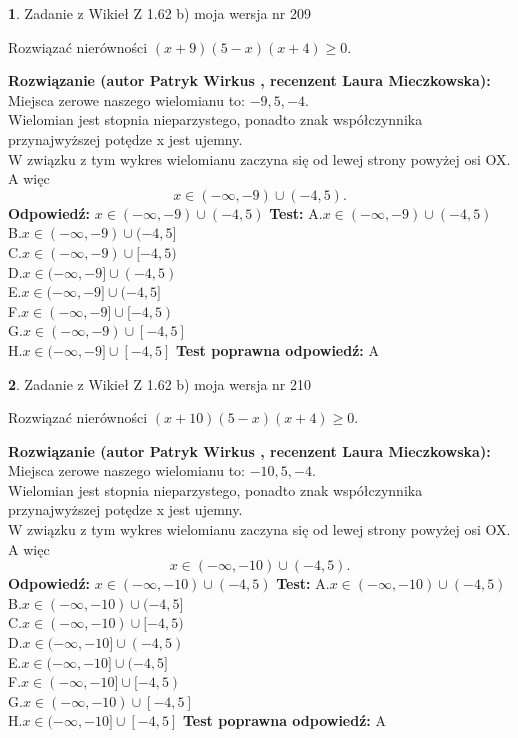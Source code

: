 \documentclass[12pt, a4paper]{article}
\theoremstyle{definition} %
\newtheorem{zad}{}
\newcommand{\zadStart}[1]{\begin{zad}#1\newline}
\newcommand{\zadStop}{\end{zad}}
\newcommand{\rozwStart}[2]{\noindent \textbf{Rozwiązanie (autor #1 , recenzent #2): }\newline}
\newcommand{\rozwStop}{\newline}
\newcommand{\odpStart}{\noindent \textbf{Odpowiedź:}\newline}
\newcommand{\odpStop}{\newline}
\newcommand{\testStart}{\noindent \textbf{Test:}\newline}
\newcommand{\testStop}{\newline}
\newcommand{\kluczStart}{\noindent \textbf{Test poprawna odpowiedź:}\newline}
\newcommand{\kluczStop}{\newline}
\begin{document}
\zadStart{Zadanie z Wikieł Z 1.62 b) moja wersja nr 209}

Rozwiązać nierówności $(x+9)(5-x)(x+4)\ge0$.
\zadStop
\rozwStart{Patryk Wirkus}{Laura Mieczkowska}
Miejsca zerowe naszego wielomianu to: $-9, 5, -4$.\\
Wielomian jest stopnia nieparzystego, ponadto znak współczynnika przy\linebreak najwyższej potędze x jest ujemny.\\ W związku z tym wykres wielomianu zaczyna się od lewej strony powyżej osi OX. A więc $$x \in (-\infty,-9) \cup (-4,5).$$
\rozwStop
\odpStart
$x \in (-\infty,-9) \cup (-4,5)$
\odpStop
\testStart
A.$x \in (-\infty,-9) \cup (-4,5)$\\
B.$x \in (-\infty,-9) \cup (-4,5]$\\
C.$x \in (-\infty,-9) \cup [-4,5)$\\
D.$x \in (-\infty,-9] \cup (-4,5)$\\
E.$x \in (-\infty,-9] \cup (-4,5]$\\
F.$x \in (-\infty,-9] \cup [-4,5)$\\
G.$x \in (-\infty,-9) \cup [-4,5]$\\
H.$x \in (-\infty,-9] \cup [-4,5]$
\testStop
\kluczStart
A
\kluczStop



\zadStart{Zadanie z Wikieł Z 1.62 b) moja wersja nr 210}

Rozwiązać nierówności $(x+10)(5-x)(x+4)\ge0$.
\zadStop
\rozwStart{Patryk Wirkus}{Laura Mieczkowska}
Miejsca zerowe naszego wielomianu to: $-10, 5, -4$.\\
Wielomian jest stopnia nieparzystego, ponadto znak współczynnika przy\linebreak najwyższej potędze x jest ujemny.\\ W związku z tym wykres wielomianu zaczyna się od lewej strony powyżej osi OX. A więc $$x \in (-\infty,-10) \cup (-4,5).$$
\rozwStop
\odpStart
$x \in (-\infty,-10) \cup (-4,5)$
\odpStop
\testStart
A.$x \in (-\infty,-10) \cup (-4,5)$\\
B.$x \in (-\infty,-10) \cup (-4,5]$\\
C.$x \in (-\infty,-10) \cup [-4,5)$\\
D.$x \in (-\infty,-10] \cup (-4,5)$\\
E.$x \in (-\infty,-10] \cup (-4,5]$\\
F.$x \in (-\infty,-10] \cup [-4,5)$\\
G.$x \in (-\infty,-10) \cup [-4,5]$\\
H.$x \in (-\infty,-10] \cup [-4,5]$
\testStop
\kluczStart
A
\kluczStop
\end{document}
